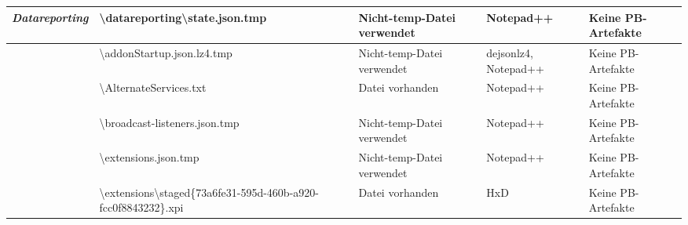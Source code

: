\begin{appendices}
{\begin{landscape}
\begin{table}[h!]
{\begin{tabular}{cllll}
	\multicolumn{1}{|c|}{\multirow{-2}{*}{\textit{Datareporting}}}                                                & \multicolumn{1}{l|}{\cellcolor[HTML]{3190FF}\textbackslash{}datareporting\textbackslash{}state.json.tmp}                                       & \multicolumn{1}{l|}{\cellcolor[HTML]{FCFF2F}Nicht-temp-Datei verwendet} & \multicolumn{1}{l|}{\cellcolor[HTML]{FFFFFF}Notepad++}            & \multicolumn{1}{l|}{\cellcolor[HTML]{F8A102}Keine PB-Artefakte} \\ \hline
	\multicolumn{1}{|c|}{}                                                                                        & \multicolumn{1}{l|}{\cellcolor[HTML]{3190FF}\textbackslash{}addonStartup.json.lz4.tmp}                                                         & \multicolumn{1}{l|}{\cellcolor[HTML]{FCFF2F}Nicht-temp-Datei verwendet} & \multicolumn{1}{l|}{\cellcolor[HTML]{FFFFFF}dejsonlz4, Notepad++} & \multicolumn{1}{l|}{\cellcolor[HTML]{F8A102}Keine PB-Artefakte} \\ \cline{2-5} 
	\multicolumn{1}{|c|}{}                                                                                        & \multicolumn{1}{l|}{\cellcolor[HTML]{3190FF}\textbackslash{}AlternateServices.txt}                                                             & \multicolumn{1}{l|}{\cellcolor[HTML]{009901}Datei vorhanden}            & \multicolumn{1}{l|}{\cellcolor[HTML]{FFFFFF}Notepad++}            & \multicolumn{1}{l|}{\cellcolor[HTML]{F8A102}Keine PB-Artefakte} \\ \cline{2-5} 
	\multicolumn{1}{|c|}{}                                                                                        & \multicolumn{1}{l|}{\cellcolor[HTML]{3190FF}\textbackslash{}broadcast-listeners.json.tmp}                                                      & \multicolumn{1}{l|}{\cellcolor[HTML]{FCFF2F}Nicht-temp-Datei verwendet} & \multicolumn{1}{l|}{\cellcolor[HTML]{FFFFFF}Notepad++}            & \multicolumn{1}{l|}{\cellcolor[HTML]{F8A102}Keine PB-Artefakte} \\ \cline{2-5} 
	\multicolumn{1}{|c|}{}                                                                                        & \multicolumn{1}{l|}{\cellcolor[HTML]{3190FF}\textbackslash{}extensions.json.tmp}                                                               & \multicolumn{1}{l|}{\cellcolor[HTML]{FCFF2F}Nicht-temp-Datei verwendet} & \multicolumn{1}{l|}{\cellcolor[HTML]{FFFFFF}Notepad++}            & \multicolumn{1}{l|}{\cellcolor[HTML]{F8A102}Keine PB-Artefakte} \\ \cline{2-5} 
	\multicolumn{1}{|c|}{}                                                                                        & \multicolumn{1}{l|}{\cellcolor[HTML]{3190FF}\textbackslash{}extensions\textbackslash{}staged\{73a6fe31-595d-460b-a920-fcc0f8843232\}.xpi}      & \multicolumn{1}{l|}{\cellcolor[HTML]{009901}Datei vorhanden}            & \multicolumn{1}{l|}{\cellcolor[HTML]{FFFFFF}HxD}                  & \multicolumn{1}{l|}{\cellcolor[HTML]{F8A102}Keine PB-Artefakte} \\ \cline{2-5} 

\end{tabular}}
\end{table}
\end{landscape}}
\end{appendices}
